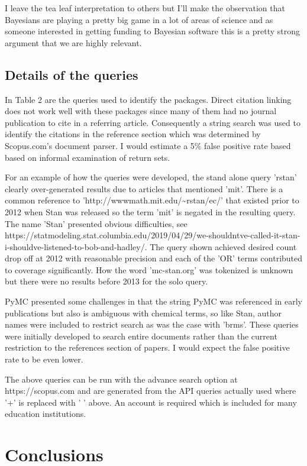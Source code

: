 \documentclass[AMA,STIX1COL]{WileyNJD-v2}
\begin{document}
I leave the tea leaf interpretation to others but I'll make the observation that Bayesians are playing a pretty big game in a lot of areas of science and as someone interested in getting funding to Bayesian software this is a pretty strong argument that we are highly relevant. 

\subsection{Details of the queries}

In Table 2 are the queries used to identify the packages. Direct citation linking does not work well with these packages since many of them had no journal publication to cite in a referring article. Consequently a string search was used to identify the citations in the reference section which was determined by Scopus.com's document parser. I would estimate a 5\% false positive rate based based on informal examination of return sets. 

For an example of how the queries were developed, the stand alone query 'rstan' clearly over-generated results due to articles that mentioned 'mit'. There is a common reference to 'http://wwwmath.mit.edu/\textasciitilde{}rstan/ec/' that existed prior to 2012 when Stan was released so the term 'mit' is negated in the resulting query. The name 'Stan' presented obvious difficulties, see https://statmodeling.stat.columbia.edu/2019/04/29/we-shouldntve-called-it-stan-i-shouldve-listened-to-bob-and-hadley/. The query shown achieved desired count drop off at 2012 with reasonable precision and each of the 'OR' terms contributed to coverage significantly. How the word 'mc-stan.org' was tokenized is unknown but there were no results before 2013 for the solo query. 

PyMC presented some challenges in that the string PyMC was referenced in early publications but also is ambiguous with chemical terms, so like Stan, author names were included to restrict search as was the case with 'brms'. These queries were initially developed to search entire documents rather than the current restriction to the references section of papers. I would expect the false positive rate to be even lower. 

The above queries can be run with the advance search option at https://scopus.com and are generated from the API queries actually used where '+' is replaced with ' ' above. An account is required which is included for many education institutions. 

\section{Conclusions}
\end{document}
